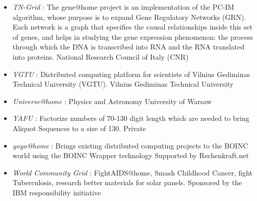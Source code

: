 \begin{itemize}
	\item {\em TN-Grid} : The gene@home project is an implementation of the PC-IM algorithm, whose purpose is to expand Gene Regulatory Networks (GRN). Each network is a graph that specifies the causal relationships inside this set of genes, and helps in studying the gene expression phenomenon: the process through which the DNA is transcribed into RNA and the RNA translated into proteins.	National Research Council of Italy (CNR)
	\item {\em VGTU} : Distributed computing platform for scientists of Vilnius Gediminas Technical University (VGTU).	Vilnius Gediminas Technical University
	\item {\em Universe@home} : Physics and Astronomy	University of Warsaw
	\item {\em YAFU} : Factorize numbers of 70-130 digit length which are needed to bring Aliquot Sequences to a size of 130.	Private	
	\item {\em yoyo@home} : Brings existing distributed computing projects to the BOINC world using the BOINC Wrapper technology	Supported by Rechenkraft.net 
	\item {\em World Community Grid} : FightAIDS@home, Smash Childhood Cancer, fight Tuberculosis, research better materials for solar panels.	Sponsored by the IBM responsibility initiative
	
\end{itemize}
		

